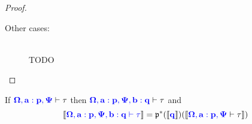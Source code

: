 \documentclass[sigplan,10pt,review,anonymous]{acmart}
\newcommand{\blu}[1]{\textbf{\color{blue}{#1}}}
\newcommand{\blum}[1]{\mathbf{\color{blue}{#1}}}
\newcommand{\sem}[1]{\llbracket #1 \rrbracket}
\newcommand{\mbf}[1]{\mathbf{#1}}
\begin{document}
\begin{proof}
\begin{description}

\iffalse
Additionally, we have\\~\\
$\mbf{T}(\blum{\Omega} ; \blum{a : p} ; \blum{\Psi} ; \blu{j})^* \sem{\blum{\Omega,a:p,\Psi} \vdash \forall \blum{q}. \kappa'}$\\
$= \mbf{T}(\blum{\Omega} ; \blum{a : p} ; \blum{\Psi} ; \blu{j})^* \Pi_{\sem{\blum{\Omega, a : p, \Psi \vdash q}}} \sem{\blum{\Omega,a:p,\Psi,b:q} \vdash \kappa'}$\\
$\cong \Pi_{ \sem{\blum{\Omega, a : p, \Psi \vdash q}} \{ \mbf{T}(\blum{\Omega} ; \blum{a : p} ; \blum{\Psi} ; \blu{j}) \} } \frak q(\mbf{T}(\blum{\Omega} ; \blum{a : p} ; \blum{\Psi} ; \blu{j}) , \sem{\blum{\Omega, a:p, \Psi \vdash q}})^* \sem{\blum{\Omega,a:p,\Psi,b : q} \vdash \kappa'}$\\
$= \Pi_{ \sem{\blum{\Omega, \Psi[j/a] \vdash q[j/a]}} } \frak q(\mbf{T}(\blum{\Omega} ; \blum{a : p} ; \blum{\Psi} ; \blu{j}) , \sem{\blum{\Omega, a:p, \Psi \vdash q}})^* \sem{\blum{\Omega,a:p,\Psi,b:q} \vdash \kappa'}$\\
$= \Pi_{ \sem{\blum{\Omega, \Psi[j/a] \vdash q[j/a]}} } \mbf T(\blum{\Omega}; \blum{p} ; \blum{(\Psi, a : q)}; \blum{j})^* \sem{\blum{\Omega,a:p,\Psi,b:q} \vdash \kappa'}$\\
$= \Pi_{ \sem{\blum{\Omega, \Psi[j/a] \vdash q[j/a]}} } \sem{\blum{\Omega,\Psi[j/a],b:q[j/a]} \vdash \kappa'[\blum{j}/\blum{a}]}$\\
$= \sem{\blum{\Omega,\Psi[j/a]} \vdash \forall \blum{q[j/a]}. \kappa'[\blum{j}/\blum{a}]}$\\
$= \sem{\blum{\Omega,\Psi[j/a]} \vdash (\forall \blum{q}. \kappa')[\blum{j}/\blum{a}]}$\\
\fi


\item[Other cases:]~\\
TODO
\end{description}

\end{proof}

\begin{lemma}
If $\blum{\Omega, a : p, \Psi} \vdash \tau$ then $\blum{\Omega, a : p, \Psi, b : q} \vdash \tau$ and $$\sem{\blum{\Omega, a : p, \Psi, b : q \vdash \tau}} = \frak p^*(\sem{\blum{q}})(\sem{\blum{\Omega, a : p, \Psi} \vdash \tau})$$
\end{lemma}
\end{document}
